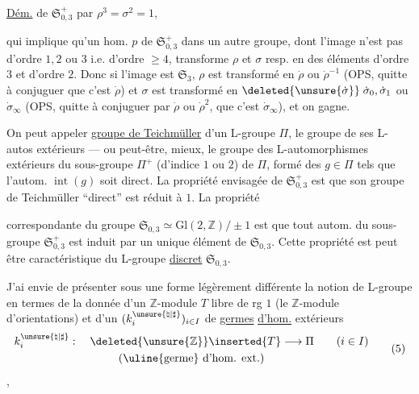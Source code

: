 \uline{Dém.} 
de $\mathfrak{S}_{0,3}^{+}$ par $\rho^3=\sigma^2=1$,

qui implique qu'un hom. $p$ de $\mathfrak S_{0,3}^{+}$ dans un autre groupe, dont l'image n'est pas d'ordre $1,2$ ou $3$ i.e. d'ordre $\geq 4$, transforme $\rho$ et $\sigma$ resp. en des éléments d'ordre $3$ et d'ordre $2$. Donc si l'image est $\mathfrak S_3$, $\rho$ est transformé en $\dot\rho$ ou $\dot\rho^{-1}$ (OPS, quitte à conjuguer  que c'est $\dot\rho$) et $\sigma$ est transformé en $\deleted{\unsure{\dot\sigma}}\;\dot\sigma_0,\dot\sigma_1$ ou $\dot\sigma_\infty$ (OPS, quitte à conjuguer par $\dot\rho$ ou $\dot\rho^2$, que c'est $\dot\sigma_\infty$), et on gagne.

On peut appeler \uline{groupe de Teichmüller} d'un L-groupe $\Pi$, le groupe de ses L-autos extérieurs --- ou peut-être, mieux, le groupe des L-automorphismes extérieurs du sous-groupe $\Pi^+$ (d'indice $1$ ou $2$) de $\Pi$, formé des $g\in\Pi$ tels que l'autom. $\operatorname{int}(g)$ soit direct. La propriété envisagée de $\mathfrak S_{0,3}^{+}$ est que son groupe de Teichmüller ``direct'' est réduit à $1$. La propriété


correspondante du groupe $\mathfrak S_{0,3}\simeq\mathrm{Gl}(2,\mathbb Z)/\pm1$ est que tout  autom. du sous-groupe $\mathfrak S_{0,3}^{+}$ est induit par un unique élément de $\mathfrak S_{0,3}$. Cette propriété est peut être caractéristique du L-groupe \uline{discret} $\mathfrak S_{0,3}$.


J'ai envie de présenter sous une forme légèrement différente la notion de L-groupe\inserted{ $\Pi$,} en termes de la donnée d'un $\mathbb Z$-module $T$ libre de rg $1$ (le $\mathbb Z$-module d'orientations) et d'un   $(k_i^{\unsure{\natural|\sharp}})_{i\in I}$ de \uline{germes} \uline{d'hom.} extérieurs
\[
\begin{gathered}
k_i^{\unsure{\natural|\sharp}}:\quad \deleted{\unsure{\mathbb Z}}\inserted{T}\longrightarrow\Pi
\qquad (i\in I)\\
(\text{\uline{germe} d'hom. ext.})
\end{gathered}
\tag{5}
\]
,

